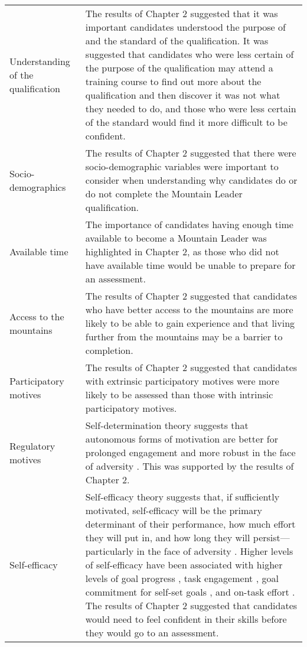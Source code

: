 \documentclass[
  12pt,
  a4paper,
]{book}
\begin{document}
\begin{landscape}
\begin{longtable}[t]{>{\raggedright\arraybackslash}p{3cm}>{\raggedright\arraybackslash}p{21cm}}
\addlinespace
Understanding of the qualification & The results of Chapter 2 suggested that it was important candidates understood the purpose of and the standard of the qualification. It was suggested that candidates who were less certain of the purpose of the qualification may attend a training course to find out more about the qualification and then discover it was not what they needed to do, and those who were less certain of the standard would find it more difficult to be confident.\\
\rowcolor{gray!6}  Socio-demographics & The results of Chapter 2 suggested that there were socio-demographic variables were important to consider when understanding why candidates do or do not complete the Mountain Leader qualification.\\
Available time & The importance of candidates having enough time available to become a Mountain Leader was highlighted in Chapter 2, as those who did not have available time would be unable to prepare for an assessment.\\
\rowcolor{gray!6}  Access to the mountains & The results of Chapter 2 suggested that candidates who have better access to the mountains are more likely to be able to gain experience and that living further from the mountains may be a barrier to completion.\\
Participatory motives & The results of Chapter 2 suggested that candidates with extrinsic participatory motives were more likely to be assessed than those with intrinsic participatory motives.\\
\addlinespace
\rowcolor{gray!6}  Regulatory motives & Self-determination theory suggests that autonomous forms of motivation are better for prolonged engagement and more robust in the face of adversity \citep{Deci1985b, Ryan2017, Ryan2019}. This was supported by the results of Chapter 2.\\
Self-efficacy & Self-efficacy theory suggests that, if sufficiently motivated, self-efficacy will be the primary determinant of their performance, how much effort they will put in, and how long they will persist—particularly in the face of adversity \citep{Bandura1977, Bandura1982, Bandura1997}. Higher levels of self-efficacy have been associated with higher levels of goal progress \citep{Sheldon1998}, task engagement \citep{Caraway2003, Walker2006}, goal commitment for self-set goals \citep{Locke1984, Locke1990}, and on-task effort \citep{Bandura1983}. The results of Chapter 2 suggested that candidates would need to feel confident in their skills before they would go to an assessment.\\

\end{longtable}
\end{landscape}
\end{document}
